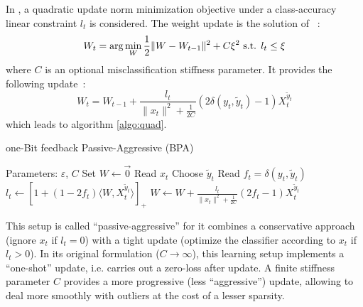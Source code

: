 \documentclass[preprint,12pt,authoryear]{elsarticle}
\begin{document}
 
In \cite{crammer2006online}, a quadratic update norm minimization objective under a class-accuracy linear constraint $ l_t $ is considered.  
The weight update is the solution of ~:
$$W_{t} = \arg \min_W \frac{1}{2} \| W - W_{t-1}\|^2 + C \xi^2 \hbox{ s.t. } l_t \leq \xi$$
where $C$ is an optional misclassification stiffness parameter. It provides the following update~:
$$W_{t} =  W_{t-1} + \frac{l_t}{\|x_t\|^2 + \frac{1}{2C}} (2\delta(y_t,\tilde{y}_t) - 1) X_t^{\tilde{y}_t}$$
which leads to algorithm \ref{algo:quad}.

\begin{algorithm}[t!]
	\caption{one-Bit feedback Passive-Aggressive (BPA)}\label{algo:quad}
	\begin{algorithmic}
		\STATE Parameters:  $\varepsilon$, $C$
		\STATE Set $W \leftarrow \vec{0}$
		\STATE Read $x_t$
		\STATE Choose $\tilde{y}_t$
		\STATE Read $f_t = \delta(y_t,\tilde{y}_t)$
		\STATE $l_t \leftarrow \left[ 1+(1-2f_t)\langle W,X_t^{\tilde{y}_t}\rangle\right]_{+}$ 
		\STATE $W \leftarrow W + \frac{l_t}{\parallel x_t\parallel^2 + \frac{1}{2C}} (2f_t-1) X_t^{\tilde{y}_t}$
		\ENDFOR
	\end{algorithmic}
\end{algorithm}

This setup is called ``passive-aggressive'' for it combines a conservative approach (ignore $x_t$ if $l_t=0$) with a tight update (optimize the classifier according to $x_t$ if $l_t>0$).
In its original formulation ($C \rightarrow \infty$), this learning setup implements a ``one-shot'' update, i.e. carries out a zero-loss  after update. A finite stiffness parameter $C$ provides a more progressive (less ``aggressive'') update, allowing to deal more smoothly with outliers at the cost of a lesser sparsity.
\end{document}
